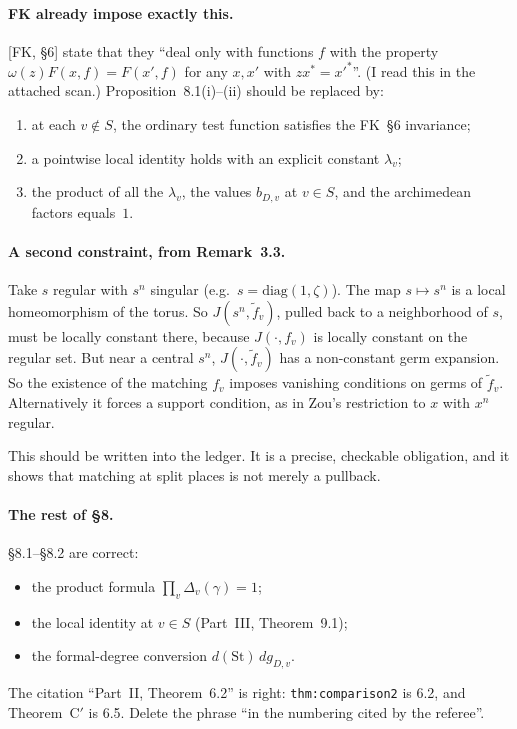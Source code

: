 \documentclass[11pt]{article}
\begin{document}
\paragraph{FK already impose exactly this.} [FK, \S6] state that they
``deal only with functions $f$ with the property
$\omega(z)F(x,f)=F(x',f)$ for any $x,x'$ with $zx^*=x'^*$''.
(I read this in the attached scan.) Proposition~8.1(i)--(ii) should be
replaced by:
\begin{enumerate}[label=(\alph*)]
\item at each $v\notin S$, the ordinary test function satisfies the FK~\S6
invariance;
\item a pointwise local identity holds with an explicit constant
$\lambda_v$;
\item the product of all the $\lambda_v$, the values $b_{D,v}$ at $v\in S$,
and the archimedean factors equals~$1$.
\end{enumerate}

\paragraph{A second constraint, from Remark~3.3.} Take $s$ regular with
$s^n$ singular (e.g.\ $s=\mathrm{diag}(1,\zeta)$). The map $s\mapsto s^n$
is a local homeomorphism of the torus. So $J(s^n,\tilde f_v)$, pulled
back to a neighborhood of $s$, must be locally constant there, because
$J(\cdot,f_v)$ is locally constant on the regular set. But near a
central $s^n$, $J(\cdot,\tilde f_v)$ has a non-constant germ expansion.
So the existence of the matching $f_v$ imposes vanishing conditions on
germs of $\tilde f_v$. Alternatively it forces a support condition, as in
Zou's restriction to $x$ with $x^n$ regular.

This should be written into the ledger. It is a precise, checkable
obligation, and it shows that matching at split places is not merely a
pullback.

\paragraph{The rest of \S8.} \S8.1--\S8.2 are correct:
\begin{itemize}
\item the product formula $\prod_v\Delta_v(\gamma)=1$;
\item the local identity at $v\in S$ (Part~III, Theorem~9.1);
\item the formal-degree conversion $d(\mathrm{St})\,dg_{D,v}$.
\end{itemize}
The citation ``Part~II, Theorem~6.2'' is right: \texttt{thm:comparison2}
is 6.2, and Theorem~C$'$ is 6.5. Delete the phrase ``in the numbering
cited by the referee''.
\end{document}
